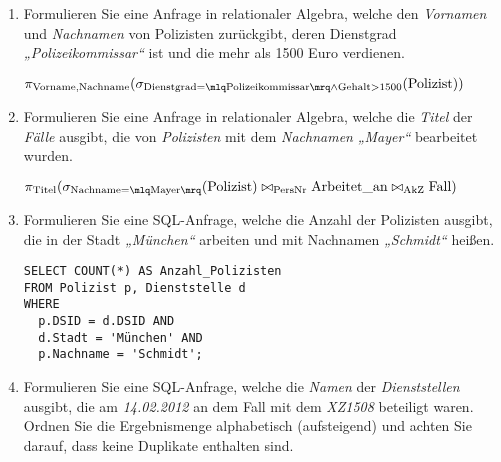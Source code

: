\documentclass{lehramt-informatik-aufgabe}
\begin{document}
\begin{enumerate}


\item Formulieren Sie eine Anfrage in relationaler
Algebra, welche den \emph{Vornamen} und
\emph{Nachnamen} von Polizisten zurückgibt, deren Dienstgrad
\emph{„Polizeikommissar“} ist und die mehr als 1500 Euro verdienen.

\begin{liAntwort}
$\pi_{\text{Vorname,Nachname}}(
  \sigma_{
    \text{Dienstgrad} = \mlq \text{Polizeikommissar} \mrq
      \land
    \text{Gehalt} > 1500
  }(\text{Polizist})
)$
\end{liAntwort}


\item Formulieren Sie eine Anfrage in relationaler Algebra, welche die
\emph{Titel} der \emph{Fälle} ausgibt, die von \emph{Polizisten} mit dem
\emph{Nachnamen} \emph{„Mayer“} bearbeitet wurden.

\begin{liAntwort}
$
\pi_{\text{Titel}}(
  \sigma_{\text{Nachname} = \mlq \text{Mayer} \mrq}(\text{Polizist})
  \bowtie_{\text{PersNr}}
  \text{Arbeitet\_an}
  \bowtie_{\text{AkZ}}
  \text{Fall}
)
$
\end{liAntwort}


\item Formulieren Sie eine SQL-Anfrage, welche die Anzahl der
Polizisten ausgibt, die in der Stadt \emph{„München“} arbeiten und mit
Nachnamen \emph{„Schmidt“} heißen.

\begin{liAntwort}
\begin{verbatim}
SELECT COUNT(*) AS Anzahl_Polizisten
FROM Polizist p, Dienststelle d
WHERE
  p.DSID = d.DSID AND
  d.Stadt = 'München' AND
  p.Nachname = 'Schmidt';
\end{verbatim}
\end{liAntwort}


\item Formulieren Sie eine SQL-Anfrage, welche die \emph{Namen} der
\emph{Dienststellen} ausgibt, die am \emph{14.02.2012} an dem Fall mit
dem \emph{XZ1508} beteiligt waren. Ordnen Sie die Ergebnismenge
alphabetisch (aufsteigend) und achten Sie darauf, dass keine Duplikate
enthalten sind.


\end{enumerate}
\end{document}
